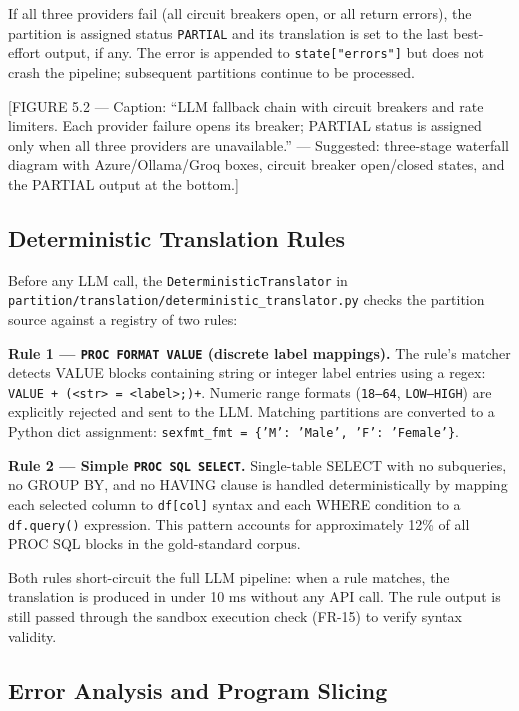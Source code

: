If all three providers fail (all circuit breakers open, or all return errors),
the partition is assigned status \texttt{PARTIAL} and its translation is set
to the last best-effort output, if any. The error is appended to
\texttt{state["errors"]} but does not crash the pipeline; subsequent partitions
continue to be processed.

[FIGURE 5.2 --- Caption: ``LLM fallback chain with circuit breakers and rate
limiters. Each provider failure opens its breaker; PARTIAL status is assigned
only when all three providers are unavailable.'' --- Suggested: three-stage
waterfall diagram with Azure/Ollama/Groq boxes, circuit breaker open/closed
states, and the PARTIAL output at the bottom.]

\subsection{Deterministic Translation Rules}
\label{subsec:deterministic-rules}

Before any LLM call, the \texttt{DeterministicTranslator} in
\texttt{partition/translation/deterministic\_translator.py} checks the partition
source against a registry of two rules:

\textbf{Rule 1 --- \texttt{PROC FORMAT VALUE} (discrete label mappings).}
The rule's matcher detects VALUE blocks containing string or integer label
entries using a regex: \texttt{VALUE\ \w+\ (\textquotesingle\textless{}str\textgreater{}\textquotesingle\
=\ \textquotesingle\textless{}label\textgreater{}\textquotesingle;)+}.
Numeric range formats (\texttt{18--64}, \texttt{LOW--HIGH}) are explicitly
rejected and sent to the LLM. Matching partitions are converted to a Python
dict assignment: \texttt{sexfmt\_fmt = \{'M': 'Male', 'F': 'Female'\}}.

\textbf{Rule 2 --- Simple \texttt{PROC SQL SELECT}.}
Single-table SELECT with no subqueries, no GROUP BY, and no HAVING clause is
handled deterministically by mapping each selected column to
\texttt{df[col]} syntax and each WHERE condition to a \texttt{df.query()}
expression. This pattern accounts for approximately 12\% of all PROC SQL
blocks in the gold-standard corpus.

Both rules short-circuit the full LLM pipeline: when a rule matches, the
translation is produced in under 10 ms without any API call. The rule output
is still passed through the sandbox execution check (FR-15) to verify syntax
validity.

\subsection{Error Analysis and Program Slicing}
\label{subsec:error-analysis-slicing}

